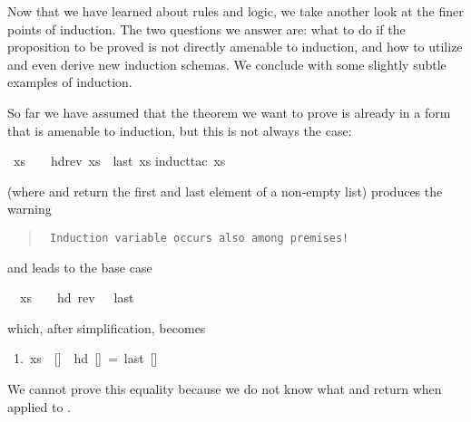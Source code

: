 %
\begin{isabellebody}%
\def\isabellecontext{AdvancedInd}%
%
\begin{isamarkuptext}%
\noindent
Now that we have learned about rules and logic, we take another look at the
finer points of induction. The two questions we answer are: what to do if the
proposition to be proved is not directly amenable to induction, and how to
utilize and even derive new induction schemas. We conclude with some slightly subtle
examples of induction.%
\end{isamarkuptext}%
%
%
\begin{isamarkuptext}%
\label{sec:ind-var-in-prems}
So far we have assumed that the theorem we want to prove is already in a form
that is amenable to induction, but this is not always the case:%
\end{isamarkuptext}%
\ {\isachardoublequote}xs\ {\isasymnoteq}\ {\isacharbrackleft}{\isacharbrackright}\ {\isasymLongrightarrow}\ hd{\isacharparenleft}rev\ xs{\isacharparenright}\ {\isacharequal}\ last\ xs{\isachardoublequote}\isanewline
{}induct{\isacharunderscore}tac\ xs{\isacharparenright}%
\begin{isamarkuptxt}%
\noindent
(where  and  return the first and last element of a
non-empty list)
produces the warning
\begin{quote}\tt
Induction variable occurs also among premises!
\end{quote}
and leads to the base case
\begin{isabelle}%
\ {}{\isachardot}\ xs\ {\isasymnoteq}\ {\isacharbrackleft}{\isacharbrackright}\ {\isasymLongrightarrow}\ hd\ {\isacharparenleft}rev\ {\isacharbrackleft}{\isacharbrackright}{\isacharparenright}\ {\isacharequal}\ last\ {\isacharbrackleft}{\isacharbrackright}%
\end{isabelle}
which, after simplification, becomes
\begin{isabelle}
\ 1.\ xs\ {\isasymnoteq}\ []\ {\isasymLongrightarrow}\ hd\ []\ =\ last\ []
\end{isabelle}
We cannot prove this equality because we do not know what  and
 return when applied to \isa{{\isacharbrackleft}{\isacharbrackright}}.


\end{isamarkuptxt}
\end{isabellebody}
